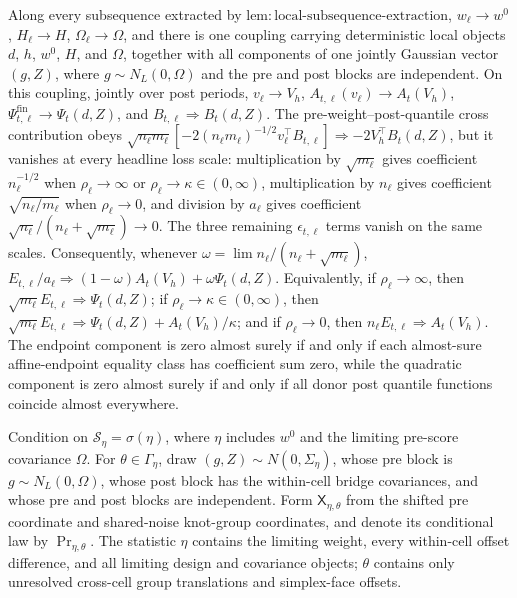 Along every subsequence extracted by \(\mathrm{lem:local\mbox{-}subsequence\mbox{-}extraction}\), \(w_\ell\to w^0\), \(H_\ell\to H\), \(\Omega_\ell\to\Omega\), and there is one coupling carrying deterministic local objects \(d\), \(h\), \(w^0\), \(H\), and \(\Omega\), together with all components of one jointly Gaussian vector \((g,Z)\), where \(g\sim N_L(0,\Omega)\) and the pre and post blocks are independent.  On this coupling, jointly over post periods, \(v_\ell\to V_h\), \(A_{t,\ell}(v_\ell)\to A_t(V_h)\), \(\Psi^{\mathrm{fin}}_{t,\ell}\to\Psi_t(d,Z)\), and \(B_{t,\ell}\Rightarrow B_t(d,Z)\).  The pre-weight--post-quantile cross contribution obeys \(\sqrt{n_\ell m_\ell}[-2(n_\ell m_\ell)^{-1/2}v_\ell^\top B_{t,\ell}]\Rightarrow-2V_h^\top B_t(d,Z)\), but it vanishes at every headline loss scale: multiplication by \(\sqrt{m_\ell}\) gives coefficient \(n_\ell^{-1/2}\) when \(\rho_\ell\to\infty\) or \(\rho_\ell\to\kappa\in(0,\infty)\), multiplication by \(n_\ell\) gives coefficient \(\sqrt{n_\ell/m_\ell}\) when \(\rho_\ell\to0\), and division by \(a_\ell\) gives coefficient \(\sqrt{n_\ell}/(n_\ell+\sqrt{m_\ell})\to0\).  The three remaining \(\epsilon_{t,\ell}\) terms vanish on the same scales.  Consequently, whenever \(\omega=\lim n_\ell/(n_\ell+\sqrt{m_\ell})\), \(E_{t,\ell}/a_\ell\Rightarrow(1-\omega)A_t(V_h)+\omega\Psi_t(d,Z)\).  Equivalently, if \(\rho_\ell\to\infty\), then \(\sqrt{m_\ell}E_{t,\ell}\Rightarrow\Psi_t(d,Z)\); if \(\rho_\ell\to\kappa\in(0,\infty)\), then \(\sqrt{m_\ell}E_{t,\ell}\Rightarrow\Psi_t(d,Z)+A_t(V_h)/\kappa\); and if \(\rho_\ell\to0\), then \(n_\ell E_{t,\ell}\Rightarrow A_t(V_h)\).  The endpoint component is zero almost surely if and only if each almost-sure affine-endpoint equality class has coefficient sum zero, while the quadratic component is zero almost surely if and only if all donor post quantile functions coincide almost everywhere.

Condition on \(\mathscr S_\eta=\sigma(\eta)\), where \(\eta\) includes \(w^0\) and the limiting pre-score covariance \(\Omega\).  For \(\theta\in\Gamma_\eta\), draw \((g,Z)\sim N(0,\Sigma_\eta)\), whose pre block is \(g\sim N_L(0,\Omega)\), whose post block has the within-cell bridge covariances, and whose pre and post blocks are independent.  Form \(\mathsf X_{\eta,\theta}\) from the shifted pre coordinate and shared-noise knot-group coordinates, and denote its conditional law by \(\Pr_{\eta,\theta}\).  The statistic \(\eta\) contains the limiting weight, every within-cell offset difference, and all limiting design and covariance objects; \(\theta\) contains only unresolved cross-cell group translations and simplex-face offsets.

